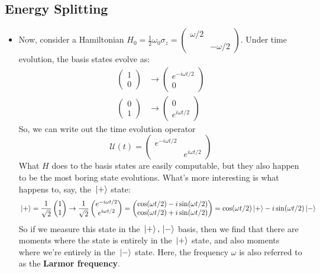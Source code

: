 \subsection{Energy Splitting}
\begin{itemize}
	\item Now, consider a Hamiltonian \( H_0 = \frac{1}{2}\omega_0 \sigma_z = 
		\begin{pmatrix} \omega / 2 & \\ & -\omega / 2 \end{pmatrix} \). Under time evolution, the 
		basis states evolve as: 
		\begin{align*}
			\begin{pmatrix} 1\\0 \end{pmatrix} &\to \begin{pmatrix} e^{-i \omega t / 2} \\0 \end{pmatrix} \\
			\begin{pmatrix} 0 \\1 \end{pmatrix} &\to \begin{pmatrix} 0 \\ e^{i \omega t/2} \end{pmatrix} 
		\end{align*}
		So, we can write out the time evolution operator 
		\[
			\mathcal U(t) = \begin{pmatrix} e^{-i \omega t /2} & \\ & e^{i \omega t / 2} \end{pmatrix} 
		\] 
		What \( H \) does to the basis states are easily computable, but they also happen to be the most boring state
		evolutions. What's more interesting is what happens to, say, the \( \ket*{+} \) state: 
		\[
			\ket*{+} = \frac{1}{\sqrt{2} }\begin{pmatrix} 1\\1 \end{pmatrix} \to 
			\frac{1}{\sqrt{2} }\begin{pmatrix} e^{-i \omega t /2}\\e^{i \omega t /2} \end{pmatrix} 
			= \begin{pmatrix} \cos(\omega t /2) - i \sin (\omega t /2)\\
			\cos(\omega t /2) + i \sin(\omega t /2)\end{pmatrix} = \cos(\omega t /2) \ket*{+} 
			- i \sin(\omega t / 2) \ket*{-}
		\] 
		So if we measure this state in the \( \ket*{+}, \ket*{-} \) basis, then we find that there are moments 
		where the state is entirely in the \( \ket*{ + }\) state, and also moments where we're 
		entirely in the \( \ket*{-} \) state. Here, the frequency \( \omega \) is also referred
		to as the \textbf{Larmor frequency}. 
\end{itemize}
